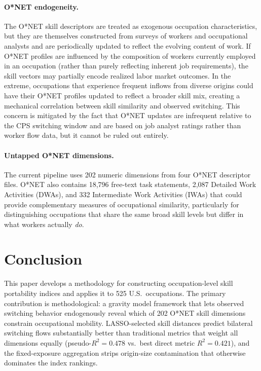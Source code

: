 \documentclass[12pt]{article}
\begin{document}
\paragraph{O*NET endogeneity.} The O*NET skill descriptors are treated as exogenous occupation characteristics, but they are themselves constructed from surveys of workers and occupational analysts and are periodically updated to reflect the evolving content of work. If O*NET profiles are influenced by the composition of workers currently employed in an occupation (rather than purely reflecting inherent job requirements), the skill vectors may partially encode realized labor market outcomes. In the extreme, occupations that experience frequent inflows from diverse origins could have their O*NET profiles updated to reflect a broader skill mix, creating a mechanical correlation between skill similarity and observed switching. This concern is mitigated by the fact that O*NET updates are infrequent relative to the CPS switching window and are based on job analyst ratings rather than worker flow data, but it cannot be ruled out entirely.

\paragraph{Untapped O*NET dimensions.} The current pipeline uses 202 numeric dimensions from four O*NET descriptor files. O*NET also contains 18,796 free-text task statements, 2,087 Detailed Work Activities (DWAs), and 332 Intermediate Work Activities (IWAs) that could provide complementary measures of occupational similarity, particularly for distinguishing occupations that share the same broad skill levels but differ in what workers actually \emph{do}.

\section{Conclusion}
\label{sec:conclusion}

This paper develops a methodology for constructing occupation-level skill portability indices and applies it to 525 U.S.\ occupations. The primary contribution is methodological: a gravity model framework that lets observed switching behavior endogenously reveal which of 202 O*NET skill dimensions constrain occupational mobility. LASSO-selected skill distances predict bilateral switching flows substantially better than traditional metrics that weight all dimensions equally (pseudo-$R^2 = 0.478$ vs.\ best direct metric $R^2 = 0.421$), and the fixed-exposure aggregation strips origin-size contamination that otherwise dominates the index rankings.
\end{document}
